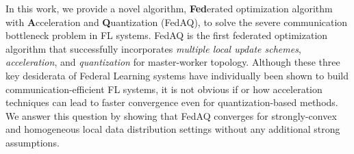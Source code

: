 \documentclass[11pt]{article}
\begin{document}
In this work, we provide a novel algorithm, \textbf{Fed}erated optimization algorithm with \textbf{A}cceleration and \textbf{Q}uantization (FedAQ), to solve the severe communication bottleneck problem in FL systems. FedAQ is the first federated optimization algorithm that successfully incorporates \emph{multiple local update schemes}, \emph{acceleration}, and \emph{quantization} for master-worker topology. Although these three key desiderata of Federal Learning systems have individually been shown to build communication-efficient FL systems, it is not obvious if or how acceleration techniques can lead to faster convergence even for quantization-based methods. We answer this question by showing that FedAQ converges for strongly-convex and homogeneous local data distribution settings without any additional strong assumptions.
\end{document}
